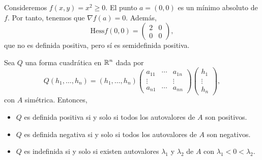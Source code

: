 \begin{eg}
Consideremos $\displaystyle f\left(x,y\right) = x^{2} \geq 0 $. El punto $\displaystyle a = \left(0,0\right) $ es un mínimo absoluto de $\displaystyle f $. Por tanto, tenemos que $\displaystyle \nabla f\left(a\right) = 0 $. Además, 
\[\text{Hess} f\left(0,0\right) = \begin{pmatrix} 2 & 0 \\ 0 & 0  \end{pmatrix} ,\]
que no es definida positiva, pero sí es semidefinida positiva. 
\end{eg}
\begin{theorem}
Sea $\displaystyle Q $ una forma cuadrática en $\displaystyle \mathbb{R}^{n} $ dada por 
\[Q\left(h_{1}, \ldots, h_{n}\right) = \left(h_{1}, \ldots, h_{n}\right)\begin{pmatrix} a_{11} & \cdots & a_{1n} \\ \vdots & & \vdots \\ a_{n1} & \cdots & a_{nn} \end{pmatrix}\begin{pmatrix} h_{1} \\ \vdots \\ h_{n} \end{pmatrix} ,\]
con $\displaystyle A $ simétrica. Entonces, 
\begin{itemize}
\item $\displaystyle Q $ es definida positiva si y solo si todos los autovalores de $\displaystyle A $ son positivos.
\item $\displaystyle Q $ es definida negativa si y solo si todos los autovalores de $\displaystyle A $ son negativos.
\item $\displaystyle Q $ es indefinida si y solo si existen autovalores $\displaystyle \lambda_{1} $ y $\displaystyle \lambda_{2} $ de $\displaystyle A $ con $\displaystyle \lambda_{1} < 0 < \lambda_{2}$.
\end{itemize}	
\end{theorem}
